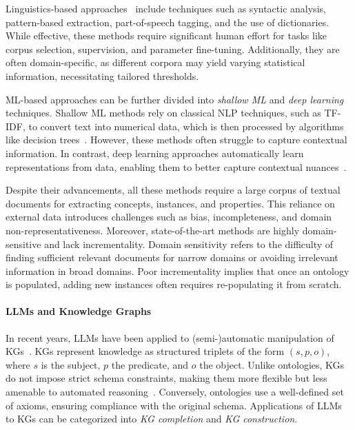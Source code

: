 Linguistics-based approaches~\cite{finkestein-1999,morin-1999,harith-2003} include techniques such as syntactic analysis, pattern-based extraction, part-of-speech tagging, and the use of dictionaries.
%
While effective, these methods require significant human effort for tasks like corpus selection, supervision, and parameter fine-tuning.
%
Additionally, they are often domain-specific, as different corpora may yield varying statistical information, necessitating tailored thresholds.


ML-based approaches can be further divided into \emph{shallow \gls{ML}} and \emph{deep learning} techniques.
%
Shallow \gls{ML} methods rely on classical \gls{NLP} techniques, such as \gls{TF-IDF}, to convert text into numerical data, which is then processed by algorithms like decision trees~\cite{tanev-2006,yoon-2007,maynard-2008,celjuska-2004,etzioni-2005,jiang-2011,souili-2015}.
%
However, these methods often struggle to capture contextual information.
%
In contrast, deep learning approaches automatically learn representations from data, enabling them to better capture contextual nuances~\cite{liu-2013,zeng-2014,ayadi-2019}.


Despite their advancements, all these methods require a large corpus of textual documents for extracting concepts, instances, and properties.
%
This reliance on external data introduces challenges such as bias, incompleteness, and domain non-representativeness.
%
Moreover, state-of-the-art methods are highly domain-sensitive and lack incrementality.
%
Domain sensitivity refers to the difficulty of finding sufficient relevant documents for narrow domains or avoiding irrelevant information in broad domains.
%
Poor incrementality implies that once an ontology is populated, adding new instances often requires re-populating it from scratch.


\paragraph{\glspl{LLM} and Knowledge Graphs}
\label{par:related-works-on-llm-and-knowledge-graphs}
%
In recent years, \glspl{LLM} have been applied to (semi-)automatic manipulation of \glspl{KG}~\cite{roadmap-kg-2024,ZhuWCQOYDCZ24,PanRKSCDJO0LBMB23}.
%
\glspl{KG} represent knowledge as structured triplets of the form \((s, p, o)\), where \(s\) is the subject, \(p\) the predicate, and \(o\) the object.
%
Unlike ontologies, \glspl{KG} do not impose strict schema constraints, making them more flexible but less amenable to automated reasoning~\cite{kg-vs-ontology-2016}.
%
Conversely, ontologies use a well-defined set of axioms, ensuring compliance with the original schema.
%
Applications of \glspl{LLM} to \glspl{KG} can be categorized into \emph{\gls{KG} completion} and \emph{\gls{KG} construction}.


